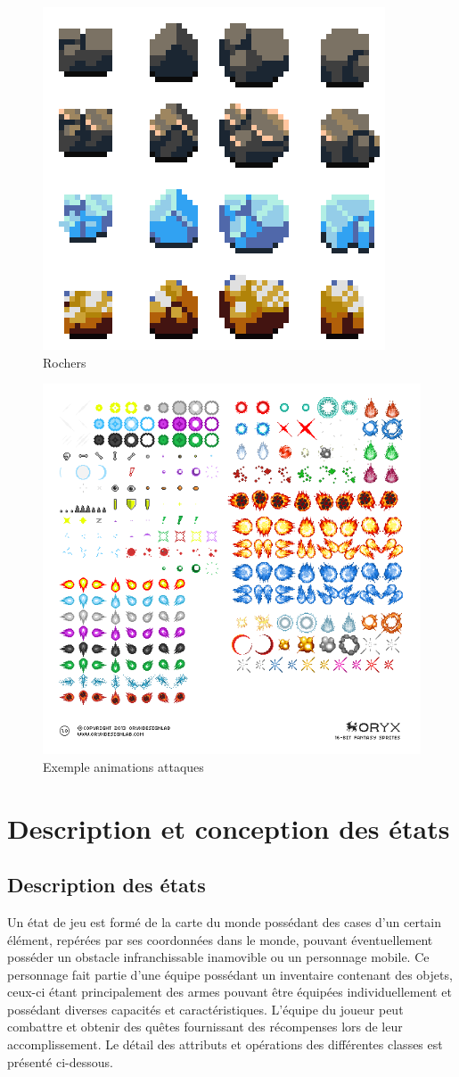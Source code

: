 \documentclass[a4paper,12pt]{article}
\begin{document}
    \begin{figure} [ht]
        \centering
        \includegraphics[width=.4\linewidth]{rocks.png}
        \caption{Rochers}
    \end{figure}

\begin{figure}[ht]
        \centering
        \includegraphics[width=\textwidth]{fx.png}
        \caption{Exemple animations attaques}
    \end{figure}

\clearpage
\section{Description et conception des états}

\subsection{Description des états}
Un état de jeu est formé de la carte du monde possédant des cases d'un certain élément, repérées par ses coordonnées dans le monde, pouvant éventuellement posséder un obstacle infranchissable inamovible ou un personnage mobile. Ce personnage fait partie d'une équipe possédant un inventaire contenant des objets, ceux-ci étant principalement des armes pouvant être équipées individuellement et possédant diverses capacités et caractéristiques. L'équipe du joueur peut combattre et obtenir des quêtes fournissant des récompenses lors de leur accomplissement.
Le détail des attributs et opérations des différentes classes est présenté ci-dessous.
\end{document}
